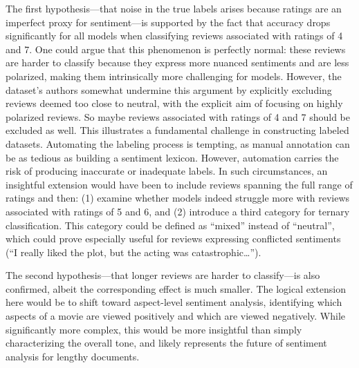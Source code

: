 \documentclass{article}
\begin{document}
The first hypothesis---that noise in the true labels arises because ratings are an imperfect proxy for sentiment---is supported by the fact that accuracy drops significantly for all models when classifying reviews associated with ratings of 4 and 7. One could argue that this phenomenon is perfectly normal: these reviews are harder to classify because they express more nuanced sentiments and are less polarized, making them intrinsically more challenging for models. However, the dataset’s authors somewhat undermine this argument by explicitly excluding reviews deemed too close to neutral, with the explicit aim of focusing on highly polarized reviews. So maybe reviews associated with ratings of 4 and 7 should be excluded as well. This illustrates a fundamental challenge in constructing labeled datasets. Automating the labeling process is tempting, as manual annotation can be as tedious as building a sentiment lexicon. However, automation carries the risk of producing inaccurate or inadequate labels. In such circumstances, an insightful extension would have been to include reviews spanning the full range of ratings and then: (1) examine whether models indeed struggle more with reviews associated with ratings of 5 and 6, and (2) introduce a third category for ternary classification. This category could be defined as \enquote{mixed} instead of \enquote{neutral}, which could prove especially useful for reviews expressing conflicted sentiments (\enquote{I really liked the plot, but the acting was catastrophic…}).

The second hypothesis---that longer reviews are harder to classify---is also confirmed, albeit the corresponding effect is much smaller. The logical extension here would be to shift toward aspect-level sentiment analysis, identifying which aspects of a movie are viewed positively and which are viewed negatively. While significantly more complex, this would be more insightful than simply characterizing the overall tone, and likely represents the future of sentiment analysis for lengthy documents.



\end{document}
